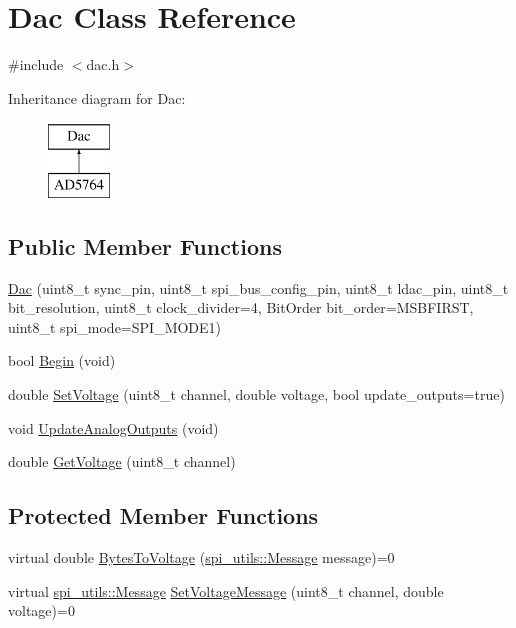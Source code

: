 \hypertarget{classDac}{}\section{Dac Class Reference}
\label{classDac}


{\ttfamily \#include $<$dac.\+h$>$}

Inheritance diagram for Dac\+:\begin{figure}[H]
\begin{center}
\leavevmode
\includegraphics[height=2.000000cm]{classDac}
\end{center}
\end{figure}
\subsection*{Public Member Functions}
\begin{DoxyCompactItemize}
\item 
\mbox{\hyperlink{classDac_a43b0ea171bf0dfad95427e9751b6e191}{Dac}} (uint8\+\_\+t sync\+\_\+pin, uint8\+\_\+t spi\+\_\+bus\+\_\+config\+\_\+pin, uint8\+\_\+t ldac\+\_\+pin, uint8\+\_\+t bit\+\_\+resolution, uint8\+\_\+t clock\+\_\+divider=4, Bit\+Order bit\+\_\+order=M\+S\+B\+F\+I\+R\+ST, uint8\+\_\+t spi\+\_\+mode=S\+P\+I\+\_\+\+M\+O\+D\+E1)
\item 
bool \mbox{\hyperlink{classDac_ad88e0048e59c0633b72769ddb8337e49}{Begin}} (void)
\item 
double \mbox{\hyperlink{classDac_ab2f0e36184b9b529de04136c36a3a51b}{Set\+Voltage}} (uint8\+\_\+t channel, double voltage, bool update\+\_\+outputs=true)
\item 
void \mbox{\hyperlink{classDac_aafef1707ec33a2166a69e9b646cd471b}{Update\+Analog\+Outputs}} (void)
\item 
double \mbox{\hyperlink{classDac_ad51bf5450f03f39a0357398af69f1705}{Get\+Voltage}} (uint8\+\_\+t channel)
\end{DoxyCompactItemize}
\subsection*{Protected Member Functions}
\begin{DoxyCompactItemize}
\item 
virtual double \mbox{\hyperlink{classDac_a1df39dc8c6e5b50afd07b6dd8a6b9300}{Bytes\+To\+Voltage}} (\mbox{\hyperlink{structspi__utils_1_1Message}{spi\+\_\+utils\+::\+Message}} message)=0
\item 
virtual \mbox{\hyperlink{structspi__utils_1_1Message}{spi\+\_\+utils\+::\+Message}} \mbox{\hyperlink{classDac_a87132e3c19313742d92f57d9b792e0e0}{Set\+Voltage\+Message}} (uint8\+\_\+t channel, double voltage)=0
\end{DoxyCompactItemize}


